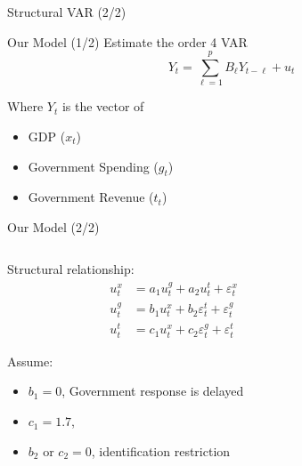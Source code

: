 \documentclass{beamer}
\begin{document}
\begin{frame}{Structural VAR (2/2)}
    \centering
    
\end{frame}

\begin{frame}{Our Model (1/2)}
    Estimate the order 4 VAR
    \[
        Y_t = \sum_{\ell = 1}^p B_\ell Y_{t - \ell} + u_t
    \]

    Where $Y_t$ is the vector of
    \begin{itemize}
        \item GDP ($x_t$)
        \item Government Spending ($g_t$)
        \item Government Revenue ($t_t$)
    \end{itemize}
\end{frame}

\begin{frame}{Our Model (2/2)}
    \begin{columns}
        \begin{column}{0.5\textwidth}
            Structural relationship:
            \begin{align*}
                u_t^x &= a_1 u_t^g + a_2 u_t^t + \varepsilon_t^x \\
                u_t^g &= b_1 u_t^x + b_2 \varepsilon_t^t + \varepsilon_t^g \\
                u_t^t &= c_1 u_t^x + c_2 \varepsilon_t^g + \varepsilon_t^t
            \end{align*}

            Assume:
            \begin{itemize}
                \item $b_1 = 0$, {\scriptsize Government response is delayed}
                \item $c_1 = 1.7$, {\scriptsize \textcite{lutz2010fiscal}}
                \item $b_2$ or $c_2 = 0$, {\scriptsize identification restriction}
            \end{itemize}
        \end{column}

        \begin{column}{0.5\textwidth}
            \centering
            

            {\scriptsize \parencite{blanchard2002empirical}}
        \end{column}
    \end{columns}
\end{frame}
\end{document}
